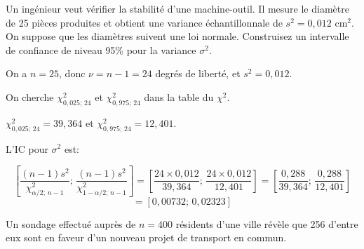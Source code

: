 \begin{questions}


\pageblanche
\question[10]\label{variance} Un ingénieur veut vérifier la stabilité d'une machine-outil. Il mesure le diamètre de 25 pièces produites et obtient une variance échantillonnale de $s^2=0{,}012$ cm$^2$. On suppose que les diamètres suivent une loi normale. Construisez un intervalle de confiance de niveau 95\% pour la variance $\sigma^2$.

\begin{solution}
On a $n=25$, donc $\nu=n-1=24$ degrés de liberté, et $s^2=0{,}012$.

On cherche $\chi^2_{0{,}025;\,24}$ et $\chi^2_{0{,}975;\,24}$ dans la table du $\chi^2$.

$\chi^2_{0{,}025;\,24}=39{,}364$ et $\chi^2_{0{,}975;\,24}=12{,}401$.

L'IC pour $\sigma^2$ est:

$$\left[\frac{(n-1)s^2}{\chi^2_{\alpha/2;\,n-1}};\, \frac{(n-1)s^2}{\chi^2_{1-\alpha/2;\,n-1}}\right]=\left[\frac{24\times 0{,}012}{39{,}364};\, \frac{24\times 0{,}012}{12{,}401}\right]=\left[\frac{0{,}288}{39{,}364};\, \frac{0{,}288}{12{,}401}\right]$$
$$=[0{,}00732;\, 0{,}02323]$$
\end{solution}




\pageblanche
\question\label{proportion} Un sondage effectué auprès de $n=400$ résidents d'une ville révèle que 256 d'entre eux sont en faveur d'un nouveau projet de transport en commun.

\end{questions}
